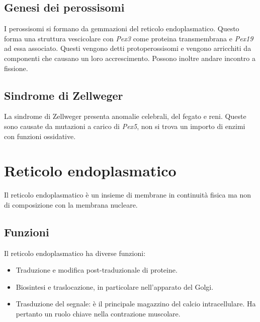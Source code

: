 	\subsection{Genesi dei perossisomi}
	I perossisomi si formano da gemmazioni del reticolo endoplasmatico.
	Questo forma una struttura vescicolare con \emph{Pex3} come proteina transmembrana e \emph{Pex19} ad essa associato.
	Questi vengono detti protoperossisomi e vengono arricchiti da componenti che causano un loro accrescimento.
	Possono inoltre andare incontro a fissione.

	\subsection{Sindrome di Zellweger}
	La sindrome di Zellweger presenta anomalie celebrali, del fegato e reni.
	Queste sono causate da mutazioni a carico di \emph{Pex5}, non si trova un importo di enzimi con funzioni ossidative.

\section{Reticolo endoplasmatico}
Il reticolo endoplasmatico \`e un insieme di membrane in continuit\`a fisica ma non di composizione con la membrana nucleare.

	\subsection{Funzioni}
	Il reticolo endoplasmatico ha diverse funzioni:
	\begin{multicols}{2}
		\begin{itemize}
			\item Traduzione e modifica post-traduzionale di proteine.
			\item Biosintesi e traslocazione, in particolare nell'apparato del Golgi.
			\item Trasduzione del segnale: \`e il principale magazzino del calcio intracellulare.
				Ha pertanto un ruolo chiave nella contrazione muscolare.
		\end{itemize}
	\end{multicols}

